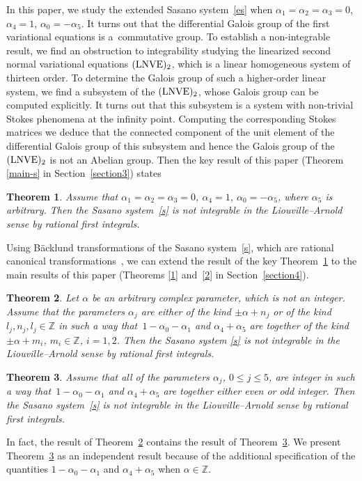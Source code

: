 \documentclass[10pt,a4paper]{amsart}
\numberwithin{equation}{section}
\newtheorem{Theorem}{Theorem}[section]
\begin{document}
 In this paper, we study the extended Sasano system~\eqref{es} when $\alpha_1=\alpha_2=\alpha_3=0$, ${\alpha_4=1}$, ${\alpha_0=-\alpha_5}$.
 It turns out that the differential Galois group of the first
 variational equations is a~commutative group.
 To establish a non-integrable result, we find an obstruction to integrability studying the linearized second normal variational equations
 $({\rm LNVE})_2$, which is a linear homogeneous system of thirteen order. To determine the Galois group of such a higher-order linear system, we find
 a subsystem of the $({\rm LNVE})_2$, whose Galois group can be computed explicitly.
 It turns out that this subsystem is a system with non-trivial Stokes phenomena at the infinity point. Computing the corresponding
 Stokes matrices we deduce that the connected component of the unit element of the differential Galois group
 of this subsystem and hence the Galois group of the $({\rm LNVE})_2$ is not an Abelian group. Then
 the key result of this paper (Theorem \ref{main-s} in Section~\ref{section3}) states

 \begin{Theorem}\label{key}
 Assume that $\alpha_1=\alpha_2=\alpha_3=0$, $\alpha_4=1$, $\alpha_0=-\alpha_5$, where $\alpha_5$ is arbitrary. Then the
 Sasano system~\eqref{s} is not integrable in the Liouville--Arnold sense by rational first integrals.
 \end{Theorem}

 Using B\"{a}cklund transformations of the Sasano system~\eqref{s}, which are rational canonical transformations~\cite{SY}, we can extend the result of the key Theorem~\ref{key} to
 the main results of this paper (Theorems \ref{1} and~\ref{2} in Section~\ref{section4}).
 \begin{Theorem}\label{main}
 Let $\alpha$ be an arbitrary complex parameter, which is not an integer. Assume that the parameters $\alpha_j$ are either of the kind
 $\pm \alpha + n_j$ or of the kind $l_j, n_j, l_j\in\mathbb{Z}$ in such a way that~${1-\alpha_0-\alpha_1}$ and
 $\alpha_4+\alpha_5$ are together of the kind $\pm \alpha + m_i$, $m_i\in\mathbb{Z}$, $i=1, 2$. Then the Sasano system
 \eqref{s} is not integrable in the Liouville--Arnold sense by rational first integrals.
 \end{Theorem}

 \begin{Theorem}\label{main0}
 Assume that all of the parameters $\alpha_j$, $0 \leq j \leq 5$, are integer in such a way that~$1-\alpha_0-\alpha_1$
 and $\alpha_4+\alpha_5$ are together either even or odd integer. Then the Sasano system~\eqref{s}
 is not integrable in the Liouville--Arnold sense by rational first integrals.
 \end{Theorem}
 In fact, the result of Theorem~\ref{main} contains the result of Theorem~\ref{main0}. We present Theorem~\ref{main0} as an independent
 result because of the additional specification of the quantities $1-\alpha_0-\alpha_1$ and $\alpha_4+\alpha_5$ when $\alpha\in\mathbb{Z}$.
\end{document}
